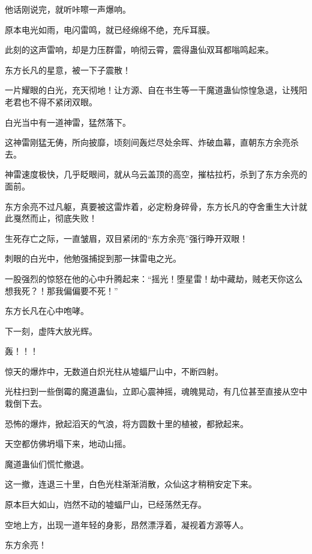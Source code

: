\begin{this_body}
他话刚说完，就听咔嚓一声爆响。

原本电光如雨，电闪雷鸣，就已经绵绵不绝，充斥耳膜。

此刻的这声雷响，却是力压群雷，响彻云霄，震得蛊仙双耳都嗡鸣起来。

东方长凡的星意，被一下子震散！

一片耀眼的白光，充天彻地！让方源、自在书生等一干魔道蛊仙惊惶急退，让残阳老君也不得不紧闭双眼。

白光当中有一道神雷，猛然落下。

这神雷刚猛无俦，所向披靡，顷刻间轰烂尽处余晖、炸破血幕，直朝东方余亮杀去。

神雷速度极快，几乎眨眼间，就从乌云盖顶的高空，摧枯拉朽，杀到了东方余亮的面前。

东方余亮不过凡躯，真要被这雷炸着，必定粉身碎骨，东方长凡的夺舍重生大计就此戛然而止，彻底失败！

生死存亡之际，一直皱眉，双目紧闭的“东方余亮”强行睁开双眼！

刺眼的白光中，他勉强捕捉到那一抹雷电之光。

一股强烈的惊怒在他的心中升腾起来：“摇光！堕星雷！劫中藏劫，贼老天你这么想我死？！那我偏偏要不死！”

东方长凡在心中咆哮。

下一刻，虚阵大放光辉。

轰！！！

惊天的爆炸中，无数道白炽光柱从墟蝠尸山中，不断四射。

光柱扫到一些倒霉的魔道蛊仙，立即心震神摇，魂魄晃动，有几位甚至直接从空中栽倒下去。

恐怖的爆炸，掀起滔天的气浪，将方圆数十里的植被，都掀起来。

天空都仿佛坍塌下来，地动山摇。

魔道蛊仙们慌忙撤退。

这一撤，连退三十里，白色光柱渐渐消散，众仙这才稍稍安定下来。

原本巨大如山，岿然不动的墟蝠尸山，已经荡然无存。

空地上方，出现一道年轻的身影，昂然漂浮着，凝视着方源等人。

东方余亮！

\end{this_body}

